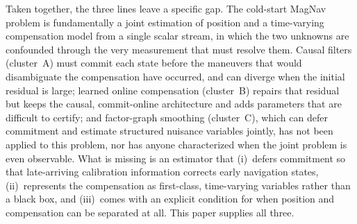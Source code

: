 \documentclass{IEEEtaes}
\begin{document}
Taken together, the three lines leave a specific gap. The cold-start MagNav problem
is fundamentally a joint estimation of position and a time-varying
compensation model from a single scalar stream, in which the two unknowns are
confounded through the very measurement that must resolve them. Causal filters
(cluster~A) must commit each state before the maneuvers that would disambiguate the
compensation have occurred, and can diverge when the initial residual is large;
learned online compensation (cluster~B) repairs that residual but keeps the causal,
commit-online architecture and adds parameters that are difficult to certify; and
factor-graph smoothing (cluster~C), which can defer commitment and estimate
structured nuisance variables jointly, has not been applied to this problem, nor has
anyone characterized when the joint problem is even observable. What is missing is
an estimator that (i)~defers commitment so that late-arriving calibration
information corrects early navigation states, (ii)~represents the compensation as
first-class, time-varying variables rather than a black box, and (iii)~comes with
an explicit condition for when position and compensation can be separated at all.
This paper supplies all three.
\end{document}
